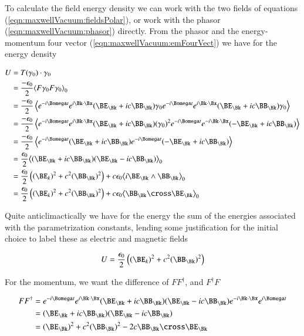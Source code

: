 To calculate the field energy density we can work with the two fields of equations (\ref{eqn:maxwellVacuum:fieldsPolar}), or work with the phasor (\ref{eqn:maxwellVacuum:phasor}) directly.  From the phasor and the energy-momentum four vector (\ref{eqn:maxwellVacuum:emFourVect}) we have for the energy density 

\begin{align*}
U &= T(\gamma_0) \cdot \gamma_0 \\
&= \frac{-\epsilon_0}{2}\gpgradezero{ F \gamma_0 F \gamma_0 } \\
&= \frac{-\epsilon_0}{2}
\left\langle{
e^{-i\Bomega t} e^{i \Bk \cdot \Bx} (\BE_\Bk + i c \BB_\Bk) \gamma_0 e^{-i\Bomega t} e^{i \Bk \cdot \Bx} (\BE_\Bk + i c \BB_\Bk) \gamma_0 
}\right\rangle \\
&= \frac{-\epsilon_0}{2}
\left\langle{
e^{-i\Bomega t} e^{i \Bk \cdot \Bx} (\BE_\Bk + i c \BB_\Bk) (\gamma_0)^2 e^{-i\Bomega t} e^{-i \Bk \cdot \Bx} (-\BE_\Bk + i c \BB_\Bk) 
}\right\rangle \\
&= \frac{-\epsilon_0}{2}
\left\langle{
e^{-i\Bomega t} (\BE_\Bk + i c \BB_\Bk) e^{-i\Bomega t} (-\BE_\Bk + i c \BB_\Bk) 
}\right\rangle \\
&= \frac{\epsilon_0}{2}\gpgradezero{ (\BE_\Bk + i c \BB_\Bk) (\BE_\Bk - i c \BB_\Bk) } \\
&= 
\frac{\epsilon_0}{2} \left( (\BE_k)^2 + c^2 (\BB_\Bk)^2\right) + {c \epsilon_0} \gpgradezero{ i \BE_\Bk \wedge \BB_\Bk } \\
&= 
\frac{\epsilon_0}{2} \left( (\BE_k)^2 + c^2 (\BB_\Bk)^2\right) + {c \epsilon_0} \gpgradezero{ \BB_\Bk \cross \BE_\Bk } \\
\end{align*}

Quite anticlimactically we have for the energy the sum of the energies associated with the parametrization constants, lending some justification for the initial choice to label these as electric and magnetic fields

\begin{align}
U = \frac{\epsilon_0}{2} \left( (\BE_k)^2 + c^2 (\BB_\Bk)^2\right)
\end{align}

For the momentum, we want the difference of $F F^\dagger$, and $F^\dagger F$

\begin{align*}
F F^\dagger 
&= e^{-i\Bomega t} e^{i \Bk \cdot \Bx} (\BE_\Bk + i c \BB_\Bk) (\BE_\Bk - i c \BB_\Bk) e^{-i \Bk \cdot \Bx} e^{i\Bomega t}  \\
&= (\BE_\Bk + i c \BB_\Bk) (\BE_\Bk - i c \BB_\Bk) \\
&= (\BE_\Bk)^2 + c^2 (\BB_\Bk)^2 - 2 c \BB_\Bk \cross \BE_\Bk
\end{align*}

